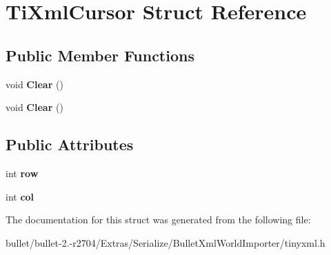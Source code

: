 \hypertarget{struct_ti_xml_cursor}{\section{Ti\+Xml\+Cursor Struct Reference}
\label{struct_ti_xml_cursor}
}
\subsection*{Public Member Functions}
\begin{DoxyCompactItemize}
\item 
\hypertarget{struct_ti_xml_cursor_a1e6fa622b59dafb71b6efe595105dcdd}{void {\bfseries Clear} ()}\label{struct_ti_xml_cursor_a1e6fa622b59dafb71b6efe595105dcdd}

\item 
\hypertarget{struct_ti_xml_cursor_a1e6fa622b59dafb71b6efe595105dcdd}{void {\bfseries Clear} ()}\label{struct_ti_xml_cursor_a1e6fa622b59dafb71b6efe595105dcdd}

\end{DoxyCompactItemize}
\subsection*{Public Attributes}
\begin{DoxyCompactItemize}
\item 
\hypertarget{struct_ti_xml_cursor_a5b54dd949820c2db061e2be41f3effb3}{int {\bfseries row}}\label{struct_ti_xml_cursor_a5b54dd949820c2db061e2be41f3effb3}

\item 
\hypertarget{struct_ti_xml_cursor_a5694d7ed2c4d20109d350c14c417969d}{int {\bfseries col}}\label{struct_ti_xml_cursor_a5694d7ed2c4d20109d350c14c417969d}

\end{DoxyCompactItemize}


The documentation for this struct was generated from the following file\+:\begin{DoxyCompactItemize}
\item 
bullet/bullet-\/2.-\/r2704/\+Extras/\+Serialize/\+Bullet\+Xml\+World\+Importer/tinyxml.\+h\end{DoxyCompactItemize}
